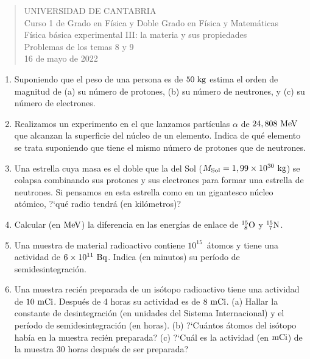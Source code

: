 \documentclass[11pt]{articulo}
\begin{document}
\begin{verse}
{\Large UNIVERSIDAD DE CANTABRIA}\\ 
\vspace*{0.5cm}
{\normalsize \rm Curso 1 de Grado en F\'isica y Doble Grado en F\'isica y Matem\'aticas}\\
{\normalsize \rm F\'isica b\'asica experimental III: la materia y sus propiedades}\\ 
{\normalsize \rm Problemas de los temas 8 y 9}\\
{\normalsize \rm 16 de mayo de 2022}\\
\end{verse} 

\vspace*{0.25cm}

\begin{enumerate}

\item Suponiendo que el peso de una persona es de $50~{\rm kg}$ estima el orden de magnitud de (a) su n\'umero de protones, (b) su n\'umero de neutrones, y (c) su n\'umero de electrones.

\item Realizamos un experimento en el que lanzamos part\'iculas $\alpha$ de $24,808~{\rm MeV}$ que alcanzan la superficie del n\'ucleo de un elemento. Indica de qu\'e elemento se trata suponiendo que tiene el mismo n\'umero de protones que de neutrones.

\item Una estrella cuya masa es el doble que la del Sol ($M_{\rm Sol} = 1,99 \times 10^{30}~{\rm kg}$) se colapsa combinando sus protones y sus electrones para formar una estrella de neutrones. Si pensamos en esta estrella como en un gigantesco n\'ucleo at\'omico, ?`qu\'e radio tendr\'a (en kil\'ometros)?

\item Calcular (en ${\rm MeV}$) la diferencia en las energ\'ias de enlace de $_{~8}^{15}{\rm O}$ y $_{~7}^{15}{\rm N}$.

\item Una muestra de material radioactivo contiene $10^{15}$~\'atomos y tiene una actividad de $6\times 10^{11}~{\rm Bq}$. Indica (en minutos) su per\'iodo de semidesintegraci\'on.

\item Una muestra reci\'en preparada de un is\'otopo radioactivo tiene una actividad de $10~{\rm mCi}$. Despu\'es de 4 horas su actividad es de $8~{\rm mCi}$. (a) Hallar la constante de desintegraci\'on (en unidades del Sistema Internacional) y el per\'iodo de semidesintegraci\'on (en horas). (b) ?`Cu\'antos \'atomos del is\'otopo hab\'ia en la muestra reci\'en preparada? (c) ?`Cu\'al es la actividad (en ${\rm mCi}$) de la muestra 30 horas despu\'es de ser preparada?


\end{enumerate}
\end{document}

